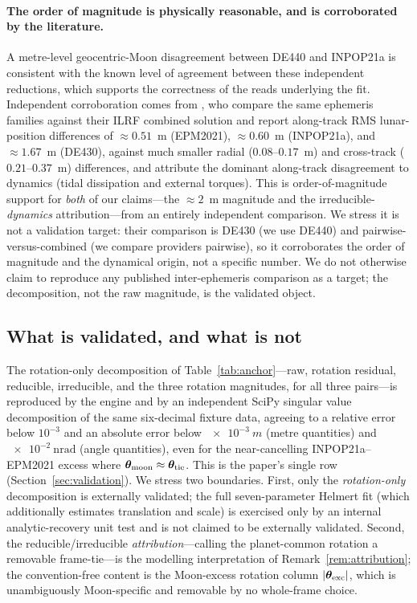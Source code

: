 \paragraph{The order of magnitude is physically reasonable, and is corroborated by the
literature.}
A metre-level geocentric-Moon disagreement between DE440 and INPOP21a is consistent
with the known level of agreement between these independent reductions, which
supports the correctness of the  reads underlying the fit. Independent
corroboration comes from \citet{sosnica2025ilrf}, who compare the same ephemeris
families against their ILRF combined solution and report along-track RMS lunar-position
differences of $\approx\!0.51$~m (EPM2021), $\approx\!0.60$~m (INPOP21a), and
$\approx\!1.67$~m (DE430), against much smaller radial ($0.08$--$0.17$~m) and
cross-track ($0.21$--$0.37$~m) differences, and attribute the dominant along-track
disagreement to dynamics (tidal dissipation and external torques). This is
order-of-magnitude support for \emph{both} of our claims---the $\approx\!2$~m
magnitude and the irreducible-\emph{dynamics} attribution---from an entirely
independent comparison. We stress it is not a validation target: their comparison is
DE430 (we use DE440) and pairwise-versus-combined (we compare providers pairwise), so
it corroborates the order of magnitude and the dynamical origin, not a specific number.
We do not otherwise claim to reproduce any published inter-ephemeris comparison as a
target; the decomposition, not the raw magnitude, is the validated object.

\subsection{What is validated, and what is not}
\label{sec:interephvalidated}

The rotation-only decomposition of Table~\ref{tab:anchor}---raw, rotation residual,
reducible, irreducible, and the three rotation magnitudes, for all three pairs---is
reproduced by the engine and by an independent SciPy singular value decomposition of
the same six-decimal fixture data, agreeing to a relative error below $10^{-3}$ and an
absolute error below $\SI{e-3}{m}$ (metre quantities) and $\SI{e-2}{\nano\radian}$
(angle quantities), even for the near-cancelling INPOP21a--EPM2021 excess where
$\bm{\theta}_{\mathrm{moon}}\approx\bm{\theta}_{\mathrm{tie}}$. This is the paper's single
\Validated{} row (Section~\ref{sec:validation}). We stress two boundaries. First,
only the \emph{rotation-only} decomposition is externally validated; the full
seven-parameter Helmert fit (which additionally estimates translation and scale) is
exercised only by an internal analytic-recovery unit test and is not claimed to be
externally validated. Second, the reducible/irreducible \emph{attribution}---calling
the planet-common rotation a removable frame-tie---is the modelling interpretation of
Remark~\ref{rem:attribution}; the convention-free content is the Moon-excess rotation
column $|\bm{\theta}_{\mathrm{exc}}|$, which is unambiguously Moon-specific and removable by
no whole-frame choice.

